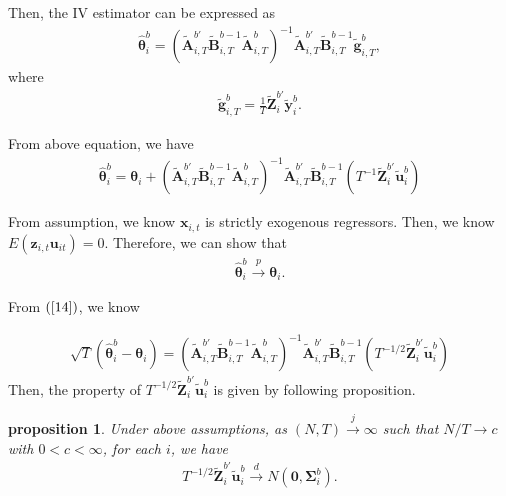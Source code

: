 \documentclass[12pt,a4paper,hyperref]{article}
\newtheorem{myProp}{proposition}
\begin{document}
Then, the IV estimator can be expressed as
\begin{align}
\boldsymbol{\hat{\theta}}^{b}_{i}=\left(\tilde{\boldsymbol{A}}_{i,T}^{b'}\tilde{\boldsymbol{B}}_{i,T}^{b -1}\tilde{\boldsymbol{A}}^{b}_{i,T} \right)^{-1}\tilde{\boldsymbol{A}}_{i,T}^{b'}\tilde{\boldsymbol{B}}_{i,T}^{b -1}\tilde{\boldsymbol{g}}^{b}_{i,T},
\end{align}
where
\begin{align}
\tilde{\boldsymbol{g}}^{b}_{i,T}=\frac{1}{T}\tilde{\boldsymbol{Z}}^{b'}_{i}\tilde{\boldsymbol{y}}^{b}_{i}.
\end{align}




From above equation, we have
\begin{align}
\boldsymbol{\hat{\theta}}^{b}_{i}=\boldsymbol{\theta}_{i}+\left(\tilde{\boldsymbol{A}}_{i,T}^{b'}\tilde{\boldsymbol{B}}_{i,T}^{b -1}\tilde{\boldsymbol{A}}^{b}_{i,T} \right)^{-1}\tilde{\boldsymbol{A}}_{i,T}^{b'}\tilde{\boldsymbol{B}}_{i,T}^{b -1}\left(T^{-1}  \tilde{\boldsymbol{Z}}^{b'}_{i}\tilde{\boldsymbol{u}}^{b}_{i} \right) \label{14}
\end{align}


From assumption, we know $\boldsymbol{x}_{i,t}$ is strictly exogenous regressors. Then, we know $ E\left(\boldsymbol{z}_{i,t} \boldsymbol{u}_{it}  \right)=0.$
Therefore, we can show that
\begin{align}
\boldsymbol{\hat{\theta}}^{b}_{i}\overset{p}{\to} \boldsymbol{\theta}_{i}.
\end{align}


From $(\ref{14})$, we know

\begin{align}
\sqrt{T}\left(\boldsymbol{\hat{\theta}}^{b}_{i}-\boldsymbol{\theta}_{i} \right)=\left(\tilde{\boldsymbol{A}}_{i,T}^{b'}\tilde{\boldsymbol{B}}_{i,T}^{b -1}\tilde{\boldsymbol{A}}^{b}_{i,T} \right)^{-1}\tilde{\boldsymbol{A}}_{i,T}^{b'}\tilde{\boldsymbol{B}}_{i,T}^{b -1}\left(T^{-1/2}  \tilde{\boldsymbol{Z}}^{b'}_{i}\tilde{\boldsymbol{u}}^{b}_{i} \right)
\end{align}
Then, the property of $T^{-1/2}  \tilde{\boldsymbol{Z}}^{b'}_{i}\tilde{\boldsymbol{u}}^{b}_{i} $ is given by following proposition.\\
\begin{myProp}
Under above assumptions, as $\left(N, T \right)\overset{j}{\to} \infty$ such that $N/T \to c$ with $0 < c<\infty $, for each $i$, we have
\begin{align}
T^{-1/2}  \tilde{\boldsymbol{Z}}^{b'}_{i}\tilde{\boldsymbol{u}}^{b}_{i} \overset{d}{\to} N\left(\boldsymbol{0},\boldsymbol{\Sigma}^{b}_{i} \right).
\end{align}
\end{myProp}
\end{document}
